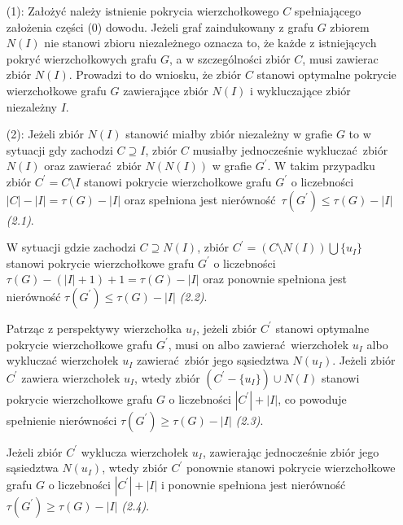 {\begin{bproof}
\begin{itemize}
      W sytuacji gdy $I = X$, w związku z faktem, że $Y \neq \emptyset$, tak jak w poprzednim przypadku spełniona jest nierówność $|Y|\geq|I|-|X|+1$.
      Ponieważ zbiór $I$ jest niezależny w grafie $G$, zastąpienie zbioru $Y \cup X$ zbiorem $N(I)$ w pokryciu wierzchołkowym $C$ owocuje pokryciem wierzchołkowym $C^\prime$ grafu $G$ o liczebności $|C^\prime| \leq |C|$.
      Wobec tego toku rozumowania łatwo zauważyć, że zbiór $C^\prime$ stanowi pokrycie wierzchołkowe grafu $G$ o najmniejszej liczebności, które zawiera zbiór $N(I)$ oraz wyłącza zbiór niezależny $I$.
      \item[(1):] Założyć należy istnienie pokrycia wierzchołkowego $C$ spełniającego założenia części (0) dowodu.
      Jeżeli graf zaindukowany z grafu $G$ zbiorem $N(I)$ nie stanowi zbioru niezależnego oznacza to, że każde z istniejących pokryć wierzchołkowych grafu $G$, a w szczególności zbiór $C$, musi zawierac zbiór $N(I)$.
      Prowadzi to do wniosku, że zbiór $C$ stanowi optymalne pokrycie wierzchołkowe grafu $G$ zawierające zbiór $N(I)$ i wykluczające zbiór niezależny $I$.
      \item[(2):] Jeżeli zbiór $N(I)$ stanowić miałby zbiór niezależny w grafie $G$ to w sytuacji gdy zachodzi $C \supseteq I$, zbiór $C$ musiałby jednocześnie wykluczać zbiór $N(I)$ oraz zawierać zbiór $N(N(I))$ w grafie $G^\prime$.
      W takim przypadku zbiór $C^\prime=C \setminus I$ stanowi pokrycie wierzchołkowe grafu $G^\prime$ o liczebności $|C|-|I|=\tau(G)-|I|$ oraz spełniona jest nierówność $\tau(G^\prime)\leq\tau(G)-|I|$ \textit{(2.1)}.

      W sytuacji gdzie zachodzi $C \supseteq N(I)$, zbiór $C^\prime=(C \setminus N(I))\bigcup\{u_I\}$ stanowi pokrycie wierzchołkowe grafu $G^\prime$ o liczebności $\tau(G)-(|I|+1)+1=\tau(G)-|I|$ oraz ponownie spełniona jest nierówność $\tau(G^\prime)\leq\tau(G)-|I|$ \textit{(2.2)}.

      Patrząc z perspektywy wierzchołka $u_I$, jeżeli zbiór $C^\prime$ stanowi optymalne pokrycie wierzchołkowe grafu $G^\prime$, musi on albo zawierać wierzchołek $u_I$ albo wykluczać wierzchołek $u_I$ zawierać zbiór jego sąsiedztwa $N(u_I)$.
      Jeżeli zbiór $C^\prime$ zawiera wierzchołek $u_I$, wtedy zbiór $(C^\prime - \{u_I\}) \cup N(I)$ stanowi pokrycie wierzchołkowe grafu $G$ o liczebności $|C^\prime|+|I|$, co powoduje spełnienie nierówności $\tau(G^\prime)\geq \tau(G)-|I|$ \textit{(2.3)}.

      Jeżeli zbiór $C^\prime$ wyklucza wierzchołek $u_I$, zawierając jednocześnie zbiór jego sąsiedztwa $N(u_I)$, wtedy zbiór $C^\prime$ ponownie stanowi pokrycie wierzchołkowe grafu $G$ o liczebności $|C^\prime|+|I|$ i ponownie spełniona jest nierówność $\tau(G^\prime)\geq \tau(G)-|I|$ \textit{(2.4)}.


\end{itemize}
\end{bproof}}
